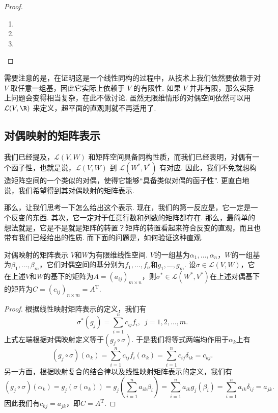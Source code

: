 \begin{proof}
    \begin{enumerate}
        \item
        \item
        \item
    \end{enumerate}
\end{proof}

需要注意的是，在证明这是一个线性同构的过程中，从技术上我们依然要依赖于对 $V$ 取任意一组基，因此它实际上依赖于 $V$ 的有限性. 如果 $V$ 并非有限，那么实际上问题会变得相当复杂，在此不做讨论. 虽然无限维情形的对偶空间依然可以用 $\mathcal{L}(V, \R)$ 来定义，超平面的直观则就不再适用了.

\subsection{对偶映射的矩阵表示}

我们已经提及，$\mathcal{L}(V, W)$ 和矩阵空间具备同构性质，而我们已经表明，对偶有一个函子性，也就是说，$\mathcal{L}(V, W)$ 到 $\mathcal{L}(W^*, V^*)$ 有对应. 因此，我们不免就想构造矩阵空间的一个类似的对偶，使得它能够``具备类似对偶的函子性''. 更直白地说，我们希望得到其对偶映射的矩阵表示.

那么，让我们思考一下怎么给出这个表示. 现在，我们的第一反应是，它一定是一个反变的东西. 其次，它一定对于任意行数和列数的矩阵都存在. 那么，最简单的想法就是，它是不是就是矩阵的转置？矩阵的转置看起来符合反变的直观，而且也带有我们已经给出的性质. 而下面的问题是，如何验证这种直观.
\begin{theorem}{}{对偶映射的矩阵表示}
    $V$和$W$为有限维线性空间. $V$的一组基为$\alpha_1,\ldots,\alpha_n$，$W$的一组基为$\beta_1,\ldots,\beta_m$，它们对偶空间的基分别为$f_1,\ldots,f_n$和$g_1,\ldots,g_m$. 设$\sigma\in\mathcal{L}(V,W)$，它在上述$V$和$W$的基下的矩阵为$A=(a_{ij})_{m \times n}$，则$\sigma^*\in\mathcal{L}(W^*,V^*)$在上述对偶基下的矩阵为$C=(c_{ij})_{n \times m}=A^\mathrm{T}$.
\end{theorem}

\begin{proof}
    根据线性映射矩阵表示的定义，我们有
    \[\sigma^*(g_j)=\sum_{i=1}^nc_{ij}f_i,\enspace j=1,2,\ldots,m.\]
    上式左端根据对偶映射定义等于$(g_j\circ\sigma)$. 于是我们将等式两端均作用于$\alpha_k$上有
    \[(g_j\circ\sigma)(\alpha_k)=\sum_{i=1}^nc_{ij}f_i(\alpha_k)=\sum_{i=1}^nc_{ij}\delta_{ik}=c_{kj}.\]
    另一方面，根据映射复合的结合律以及线性映射矩阵表示的定义，我们有
    \[(g_j\circ\sigma)(\alpha_k)=g_j(\sigma(\alpha_k))=g_j\left(\sum_{i=1}^na_{ik}\beta_i\right)=\sum_{i=1}^na_{ik}g_j(\beta_i)=\sum_{i=1}^na_{ik}\delta_{ij}=a_{jk}.\]
    因此我们有$c_{kj}=a_{jk}$，即$C=A^\mathrm{T}$.
\end{proof}

